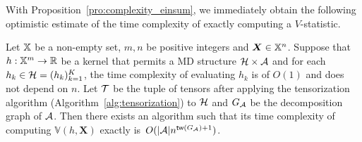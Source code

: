 \documentclass[letterpaper,11pt]{article}
\newcommand{\Lin}[1]{{\color{purple}{Lin: #1}}}
\newcommand{\libref}[2]{\href{#2}{\texttt{#1}}}
\newcommand{\vstat}{\mathbb{V}}
\newcommand{\samplespace}{\bbX}
\newcommand{\degp}[2]{\deg(#1,#2)}
\newcommand{\treewidthp}[1]{\mathsf{tw}(#1)}
\newcommand{\graphform}[1]{G_{#1}}
\newcommand{\less}{O}
\newcommand{\eliminatevg}[2]{\mathsf{elim}_{#1}(#2)}
\begin{document}
\begin{bibunit}[plainnat]
With Proposition~\ref{pro:complexity_einsum}, we immediately obtain the following optimistic estimate of the time complexity of exactly computing a $V$-statistic.

\begin{corollary}\label{pro:complexity_v}
Let ${\mathbb{X}}$ be a non-empty set, $m, n$ be positive integers and $\bm{X} \in \samplespace^n$. Suppose that $h: {\mathbb{X}}^{m} \rightarrow {\mathbb{R}}$ be a kernel that permits a MD structure ${\mathcal{H}} \times {\mathcal{A}}$ and for each $h_k \in {\mathcal{H}} = (h_k)_{k = 1}^{K}$, the time complexity of evaluating $h_k$ is of $O (1)$ and does not depend on $n$. Let ${\mathcal{T}}$ be the tuple of tensors after applying the tensorization algorithm (Algorithm~\ref{alg:tensorization}) to ${\mathcal{H}}$ and $G_{\mathcal{A}}$ be the decomposition graph of ${\mathcal{A}}$. Then there exists an algorithm such that its time complexity of computing $\vstat(h,\bm{X})$ exactly is~$\less(|\calA| n^{\treewidthp{G_\calA}+1})$. 
\end{corollary}







\end{bibunit}
\end{document}
